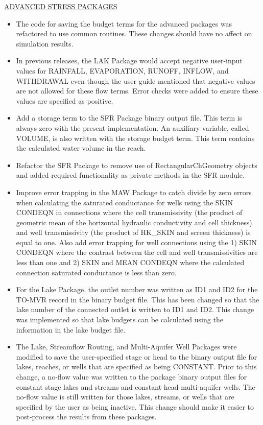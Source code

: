 \begin{itemize}
	\underline{ADVANCED STRESS PACKAGES}
	\begin{itemize}
		\item The code for saving the budget terms for the advanced packages was refactored to use common routines.  These changes should have no affect on simulation results.
		\item In previous releases, the LAK Package would accept negative user-input values for  RAINFALL, EVAPORATION, RUNOFF, INFLOW, and WITHDRAWAL even though the user guide mentioned that negative values are not allowed for these flow terms.  Error checks were added to ensure these values are specified as positive.
		\item Add a storage term to the SFR Package binary output file.  This term is always zero with the present implementation.  An auxiliary variable, called VOLUME, is also written with the storage budget term.  This term contains the calculated water volume in the reach.
		\item Refactor the SFR Package to remove use of RectangularChGeometry objects and added required functionality as private methods in the SFR module.
		\item  Improve error trapping in the MAW Package to catch divide by zero errors when calculating the saturated conductance for wells using the SKIN CONDEQN in connections where the cell  transmissivity (the product of geometric mean of the horizontal hydraulic conductivity and cell thickness) and well transmissivity (the product of HK\_SKIN and screen thickness) is equal to one. Also add error trapping for well connections using the 1) SKIN CONDEQN where the contrast between the cell and well transmissivities are less than one and 2) SKIN and MEAN CONDEQN where the calculated connection saturated conductance is less than zero.
		\item For the Lake Package, the outlet number was written as ID1 and ID2 for the TO-MVR record in the binary budget file.  This has been changed so that the lake number of the connected outlet is written to ID1 and ID2.  This change was implemented so that lake budgets can be calculated using the information in the lake budget file.
		\item The Lake, Streamflow Routing, and Multi-Aquifer Well Packages were modified to save the user-specified stage or head to the binary output file for lakes, reaches, or wells that are specified as being CONSTANT.  Prior to this change, a no-flow value was written to the package binary output files for constant stage lakes and streams and constant head multi-aquifer wells.  The no-flow value is still written for those lakes, streams, or wells that are specified by the user as being inactive.  This change should make it easier to post-process the results from these packages.
	\end{itemize}


\end{itemize}
